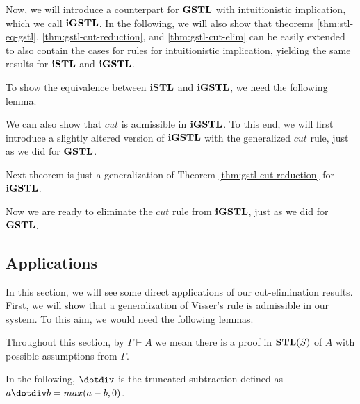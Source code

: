 \documentclass[12pt,a4paper]{article}
\begin{document}


Now, we will introduce a counterpart for $\mathbf{GSTL}$ with intuitionistic implication, which we call $\mathbf{iGSTL}$. In the following, we will also show that theorems \ref{thm:stl-eq-gstl}, \ref{thm:gstl-cut-reduction}, and \ref{thm:gstl-cut-elim} can be easily extended to also contain the cases for rules for intuitionistic implication, yielding the same results for $\mathbf{iSTL}$ and $\mathbf{iGSTL}$.



To show the equivalence between $\mathbf{iSTL}$ and $\mathbf{iGSTL}$, we need the following lemma.





We can also show that $cut$ is admissible in $\mathbf{iGSTL}$. To this end, we will first introduce a slightly altered version of $\mathbf{iGSTL}$ with the generalized $cut$ rule, just as we did for $\mathbf{GSTL}$.







Next theorem is just a generalization of Theorem \ref{thm:gstl-cut-reduction} for $\mathbf{iGSTL}$.



Now we are ready to eliminate the $cut$ rule from $\mathbf{iGSTL}$, just as we did for $\mathbf{GSTL}$.



\subsection{Applications}
In this section, we will see some direct applications of our cut-elimination results. First, we will show that a generalization of Visser's rule is admissible in our system. To this aim, we would need the following lemmas.

Throughout this section, by $\Gamma \vdash A$ we mean there is a proof in $\mathbf{STL}(S)$ of $A$ with possible assumptions from $\Gamma$.







\begin{rem}
	In the following, $\dotdiv$ is the truncated subtraction defined as $a \dotdiv b = max(a-b, 0)$.
\end{rem}
\end{document}
